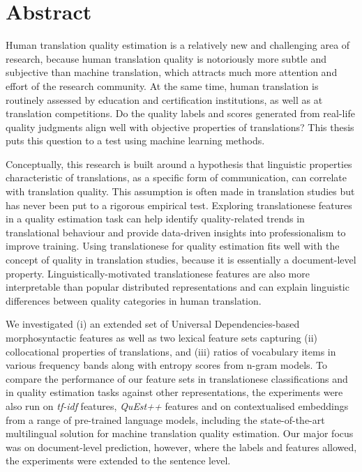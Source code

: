 

\chapter*{Abstract}
Human translation quality estimation is a relatively new and challenging area of research, because human translation quality is notoriously more subtle and subjective than machine translation, which attracts much more attention and effort of the research community. At the same time, human translation is routinely assessed by education and certification institutions, as well as at translation competitions. Do the quality labels and scores generated from real-life quality judgments align well with objective properties of translations? This thesis puts this question to a test using machine learning methods.

Conceptually, this research is built around a hypothesis that linguistic properties characteristic of translations, as a specific form of communication, can correlate with translation quality. This assumption is often made in translation studies but has never been put to a rigorous empirical test. Exploring translationese features in a quality estimation task can help identify quality-related trends in translational behaviour and provide data-driven insights into professionalism to improve training. Using translationese for quality estimation fits well with the concept of quality in translation studies, because it is essentially a document-level property. Linguistically-motivated translationese features are also more interpretable than popular distributed representations and can explain linguistic differences between quality categories in human translation.

We investigated (i) an extended set of Universal Dependencies-based morphosyntactic features as well as two lexical feature sets capturing (ii) collocational properties of translations, and (iii) ratios of vocabulary items in various frequency bands along with entropy scores from n-gram models. To compare the performance of our feature sets in translationese classifications and in quality estimation tasks against other representations, the experiments were also run on \textit{tf-idf} features, \textit{QuEst++} features and on contextualised embeddings from a range of pre-trained language models, including the state-of-the-art multilingual solution for machine translation quality estimation. Our major focus was on document-level prediction, however, where the labels and features allowed, the experiments were extended to the sentence level.

